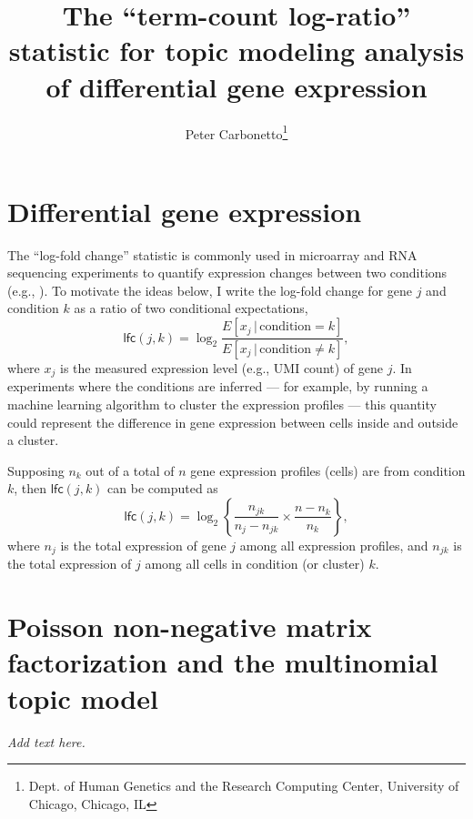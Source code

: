 \documentclass[final]{siamart171218}
\title{The ``term-count log-ratio'' statistic for topic modeling analysis
  of differential gene expression}
\author{Peter Carbonetto\thanks{Dept. of Human Genetics and the Research Computing Center, University of Chicago, Chicago, IL}}
\begin{document}
\maketitle

\section{Differential gene expression}

The ``log-fold change'' statistic is commonly used in microarray and
RNA sequencing experiments to quantify expression changes between two
conditions (e.g., \cite{cui-churchill-2003, quackenbush-2002}). To
motivate the ideas below, I write the log-fold change for gene $j$
and condition $k$ as a ratio of two conditional expectations,
\begin{equation*}
\mathsf{lfc}(j,k) = \log_2 \frac{E[x_j \,|\, \mathrm{condition} = k]}
                                {E[x_j \,|\, \mathrm{condition} \neq k]},
\end{equation*}
where $x_j$ is the measured expression level (e.g., UMI count) of gene
$j$. In experiments where the conditions are inferred --- for example,
by running a machine learning algorithm to cluster the expression
profiles --- this quantity could represent the difference in gene
expression between cells inside and outside a cluster.

Supposing $n_k$ out of a total of $n$ gene expression profiles
(cells) are from condition $k$, then $\mathsf{lfc}(j,k)$ can be
computed as
\begin{equation*}
\mathsf{lfc}(j,k) =
\log_2 \left\{\frac{n_{jk}}{n_j - n_{jk}} \times \frac{n - n_k}{n_k} \right\},
\end{equation*}
where $n_j$ is the total expression of gene $j$ among all expression
profiles, and $n_{jk}$ is the total expression of $j$ among all cells
in condition (or cluster) $k$.
  
\section{Poisson non-negative matrix factorization and the multinomial
  topic model}

{\em Add text here.}



\end{document}
